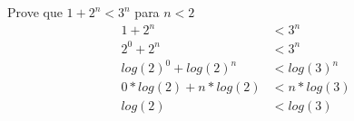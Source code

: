 \begin{question}
	Prove que $1 + 2^{n} < 3^{n}$ para $n < 2$
   \begin{equation}
	  \begin{split}
	  		1 + 2^{n} &< 3^{n} \\
			2^{0} + 2^{n} &< 3^{n} \\
			log(2)^{0} + log(2)^{n} &< log(3)^{n} \\
			0*log(2) + n*log(2) &< n* log(3)\\
			log(2) &< log(3) \\
		\end{split}
	\end{equation}
\end{question}